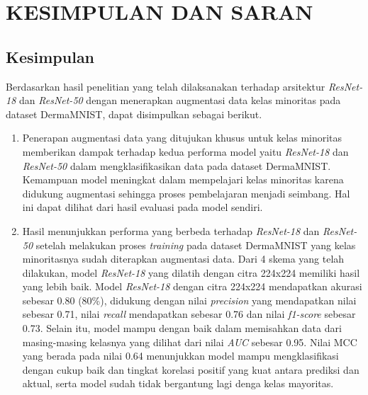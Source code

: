 \newpage
\chapter{KESIMPULAN DAN SARAN} \label{Bab V}

\section{Kesimpulan} \label{V.Kesimpulan}
Berdasarkan hasil penelitian yang telah dilaksanakan terhadap arsitektur 
\textit{ResNet-18} dan \textit{ResNet-50} dengan menerapkan augmentasi 
data kelas minoritas pada dataset DermaMNIST, dapat disimpulkan sebagai 
berikut.

\begin{enumerate}[noitemsep]
    \item Penerapan augmentasi data yang ditujukan khusus untuk kelas 
    minoritas memberikan dampak terhadap kedua performa model yaitu \textit{ResNet-18} 
    dan \textit{ResNet-50} dalam mengklasifikasikan data pada dataset 
    DermaMNIST. Kemampuan model meningkat dalam mempelajari kelas minoritas 
    karena didukung augmentasi sehingga proses pembelajaran menjadi 
    seimbang. Hal ini dapat dilihat dari hasil evaluasi pada model sendiri.

    \item Hasil menunjukkan performa yang berbeda terhadap \textit{ResNet-18} 
    dan \textit{ResNet-50} setelah melakukan proses \textit{training} 
    pada dataset DermaMNIST yang kelas minoritasnya sudah diterapkan 
    augmentasi data. Dari 4 skema yang telah dilakukan, model \textit{ResNet-18} 
    yang dilatih dengan citra 224x224 memiliki hasil yang lebih baik. 
    Model \textit{ResNet-18} dengan citra 224x224 mendapatkan akurasi 
    sebesar 0.80 (80\%), didukung dengan nilai \textit{precision} yang 
    mendapatkan nilai sebesar 0.71, nilai \textit{recall} mendapatkan 
    sebesar 0.76 dan nilai \textit{f1-score} sebesar 0.73. Selain itu, 
    model mampu dengan baik dalam memisahkan data dari masing-masing 
    kelasnya yang dilihat dari nilai \textit{AUC} sebesar 0.95. Nilai 
    MCC yang berada pada nilai 0.64 menunjukkan model mampu mengklasifikasi 
    dengan cukup baik dan tingkat korelasi positif yang kuat antara prediksi 
    dan aktual, serta model sudah tidak bergantung lagi denga kelas 
    mayoritas.
\end{enumerate}



